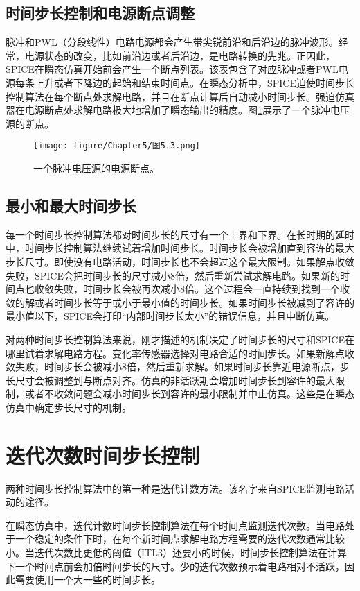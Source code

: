 \subsection{时间步长控制和电源断点调整}
脉冲和PWL（分段线性）电路电源都会产生带尖锐前沿和后沿边的脉冲波形。经常，电源状态的改变，比如前沿边或者后沿边，是电路转换的先兆。正因此，SPICE在瞬态仿真开始前会产生一个断点列表。该表包含了对应脉冲或者PWL电源每条上升或者下降边的起始和结束时间点。在瞬态分析中，SPICE迫使时间步长控制算法在每个断点处求解电路，并且在断点计算后自动减小时间步长。强迫仿真器在电源断点处求解电路极大地增加了瞬态输出的精度。图\ref{图5.3}展示了一个脉冲电压源的断点。

\begin{figure}[htbp]
\small
    \centering
    \texttt{[image: figure/Chapter5/图5.3.png]}
    \caption{一个脉冲电压源的电源断点。}
    \label{图5.3}
\end{figure}

\subsection{最小和最大时间步长}
每一个时间步长控制算法都对时间步长的尺寸有一个上界和下界。在长时期的延时中，时间步长控制算法继续试着增加时间步长。时间步长会被增加直到容许的最大步长尺寸。即使没有电路活动，时间步长也不会超过这个最大限制。如果解点收敛失败，SPICE会把时间步长的尺寸减小8倍，然后重新尝试求解电路。如果新的时间点也收敛失败，时间步长会被再次减小8倍。这个过程会一直持续到找到一个收敛的解或者时间步长等于或小于最小值的时间步长。如果时间步长被减到了容许的最小值以下，SPICE会打印“内部时间步长太小”的错误信息，并且中断仿真。

对两种时间步长控制算法来说，刚才描述的机制决定了时间步长的尺寸和SPICE在哪里试着求解电路方程。变化率传感器选择对电路合适的时间步长。如果新解点收敛失败，时间步长会被减小8倍，然后重新求解。如果时间步长靠近电源断点，步长尺寸会被调整到与断点对齐。仿真的非活跃期会增加时间步长到容许的最大限制，或者不收敛问题会减小时间步长到容许的最小限制并中止仿真。这些是在瞬态仿真中确定步长尺寸的机制。

\section{迭代次数时间步长控制}
两种时间步长控制算法中的第一种是迭代计数方法。该名字来自SPICE监测电路活动的途径。

在瞬态仿真中，迭代计数时间步长控制算法在每个时间点监测迭代次数。当电路处于一个稳定的条件下时，在每个新时间点求解电路方程需要的迭代次数通常比较小。当迭代次数比更低的阈值（ITL3）还要小的时候，时间步长控制算法在计算下一个时间点前会加倍时间步长的尺寸。少的迭代次数预示着电路相对不活跃，因此需要使用一个大一些的时间步长。

